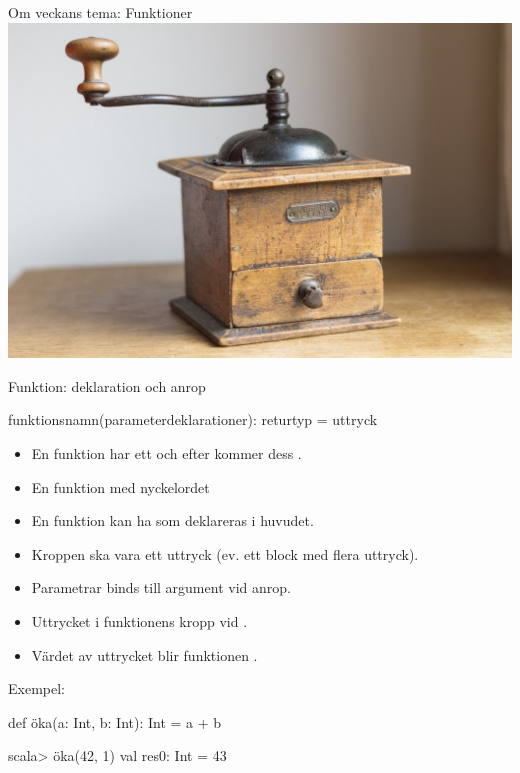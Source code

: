 \begin{SlideExtra}{Om veckans tema: Funktioner}
  \includegraphics[width=1.0\textwidth]{../img/coffee-grinder}
\end{SlideExtra}
\fi


\begin{Slide}{Funktion: deklaration och anrop}
\SlideOnly{\setlength{\leftmargini}{0pt}}

 funktionsnamn(parameterdeklarationer): returtyp = uttryck
\vspace{0.5em}


\begin{itemize}\SlideFontSmall
  \item En funktion har ett  och efter \code{=} kommer dess .
  \item En  funktion  med nyckelordet 
  \item En funktion kan ha  som deklareras i huvudet. 
  \item Kroppen ska vara ett uttryck (ev. ett block med flera uttryck).
  \item Parametrar binds till argument vid anrop.
  \item Uttrycket i funktionens kropp  vid . 
  \item Värdet av uttrycket blir funktionen . 
\end{itemize}

\pause
Exempel:
\begin{Code}
def öka(a: Int, b: Int): Int = a + b
\end{Code}
\pause
\begin{REPLnonum}
scala> öka(42, 1)
val res0: Int = 43
\end{REPLnonum}

\end{Slide}



